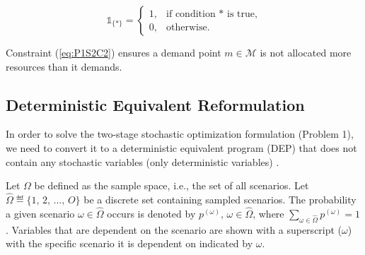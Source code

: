 \documentclass[conference]{IEEEtran}
\begin{document}
\[ \mathbb{1}_{\{*\}} =
	\begin{cases}
		1,& \text{if condition $*$ is true,}\\
		0,& \text{otherwise}.
	\end{cases}
\]

Constraint (\ref{eq:P1S2C2}) ensures a demand point $m \in \mathcal{M}$ is not allocated more resources than it demands.

\subsection{Deterministic Equivalent Reformulation} \label{subsec:dep}

In order to solve the two-stage stochastic optimization formulation (Problem 1), we need to convert it to a deterministic equivalent program (DEP) that does not contain any stochastic variables (only deterministic variables) \cite{stochprogramming}.

Let $\Omega$ be defined as the sample space, i.e., the set of all scenarios.  Let $\hat{\Omega} \eqdef \{1,\, 2,\, \ldots,\, O\}$ be a discrete set containing sampled scenarios.  The probability a given scenario $\omega \in \hat{\Omega}$ occurs is denoted by $p^{(\omega)},\, \omega \in \hat{\Omega}$, where $\sum_{\omega \in \hat{\Omega}} p^{(\omega)} = 1$.  Variables that are dependent on the scenario are shown with a superscript ($\omega$) with the specific scenario it is dependent on indicated by $\omega$.
\end{document}
